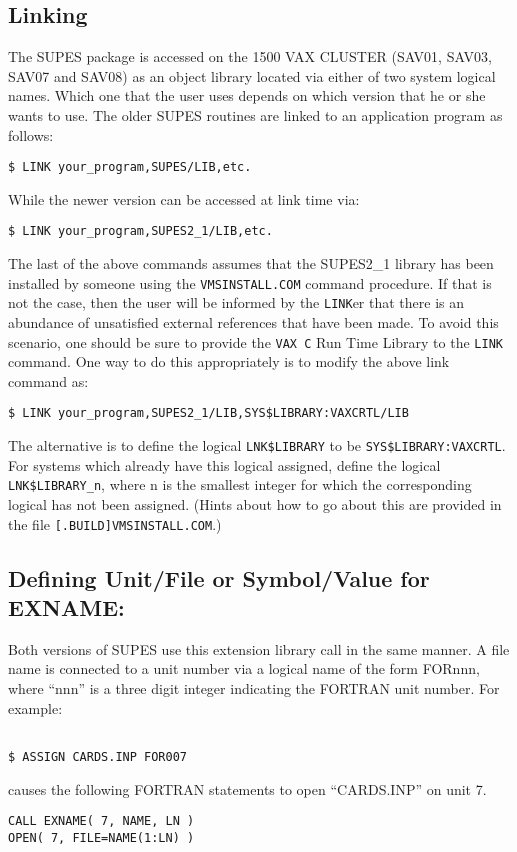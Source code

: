 \subsection{Linking}
The SUPES package is accessed on the 1500 VAX CLUSTER (SAV01, SAV03,
SAV07 and SAV08) as an object library located via either of two system logical
names.
Which one that the user uses depends on which version that he or she
wants to use.
The older
SUPES routines are linked to an application program as follows:

\begin{verbatim}
$ LINK your_program,SUPES/LIB,etc.
\end{verbatim}
While the newer version can be accessed at link time via:
\begin{verbatim}
$ LINK your_program,SUPES2_1/LIB,etc.
\end{verbatim}
The last of the above commands assumes that the SUPES2\_1 library has
been installed by someone using the \verb+VMSINSTALL.COM+
command procedure.
If that is not the case,
then the user will be informed by
the \verb+LINK+er that there is an abundance of unsatisfied
external references that have been made.
To avoid this scenario,
one should be sure to provide the \verb+VAX C+ Run Time Library
to the \verb+LINK+ command.
One way to do this appropriately is to modify the above
link command as:
\begin{verbatim}
$ LINK your_program,SUPES2_1/LIB,SYS$LIBRARY:VAXCRTL/LIB
\end{verbatim}
The alternative is to define the logical \verb+LNK$LIBRARY+
to be \verb+SYS$LIBRARY:VAXCRTL+.
For systems which already have this logical assigned,
define the logical \verb+LNK$LIBRARY_n+,
where n is the smallest integer for which the corresponding
logical has not been assigned.
(Hints about how to go about this are provided in the
file \verb+[.BUILD]VMSINSTALL.COM+.)

\subsection{Defining Unit/File or Symbol/Value for EXNAME:}
Both versions of SUPES use this extension library call in the
same manner.
A file name is connected to a unit number via a logical name of the form
FORnnn,  where ``nnn'' is a three digit integer indicating the FORTRAN unit
number. For example:
\begin{verbatim}

$ ASSIGN CARDS.INP FOR007

\end{verbatim}
causes the following FORTRAN statements to open ``CARDS.INP'' on unit 7.
\begin{verbatim}
CALL EXNAME( 7, NAME, LN )
OPEN( 7, FILE=NAME(1:LN) )
\end{verbatim}

